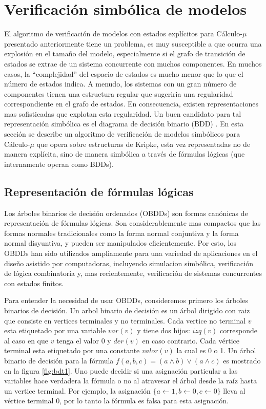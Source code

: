 \chapter{Verificación simbólica de modelos}

El algoritmo de verificación de modelos con estados explícitos para Cálculo-$\mu$ presentado anteriormente tiene un problema, es muy susceptible a que ocurra una explosión en el tamaño del modelo, especialmente si el grafo de transición de estados se extrae de un sistema concurrente con muchos componentes. En muchos casos, la “complejidad” del espacio de estados es mucho menor que lo que el número de estados indica. A menudo, los sistemas con un gran número de componentes tienen una estructura regular que sugeriria una regularidad correspondiente en el grafo de estados. En consecuencia, existen representaciones mas sofisticadas que explotan esta regularidad. Un buen candidato para tal representación simbólica es el diagrama de decisión binario (BDD) \cite{Burch:4}. En esta sección se describe un algoritmo de verificación de modelos simbólicos para Cálculo-$\mu$ que opera sobre estructuras de Kripke, esta vez representadas no de manera explícita, sino de manera simbólica a través de fórmulas lógicas (que internamente operan como BDDs).

\section{Representación de fórmulas lógicas}

Los árboles binarios de decisión ordenados (OBDDs) son formas canónicas de representación de fórmulas lógicas. Son considerablemente mas compactos que las formas normales tradicionales como la forma normal conjuntiva y la forma normal disyuntiva, y pueden ser manipulados eficientemente. Por esto, los OBDDs han sido utilizados ampliamente para una variedad de aplicaciones en el diseño asistido por computadoras, incluyendo simulacion simbólica, verificación de lógica combinatoria y, mas recientemente, verificación de sistemas concurrentes con estados finitos.

Para entender la necesidad de usar OBDDs, consideremos primero los árboles binarios de decisión. Un arbol binario de decisión es un árbol dirigido con raiz que consiste en vertices terminales y no terminales. Cada vertice no terminal $v$ esta etiquetado por una variable $var(v)$ y tiene dos hijos: $izq(v)$ corresponde al caso en que $v$ tenga el valor 0 y $der(v)$ en caso contrario. Cada vértice terminal esta etiquetado por una constante $valor(v)$ la cual es 0 o 1. Un árbol binario de decisión para la fórmula $f(a,b,c) = (a \land b) \lor (a \land c)$ es mostrado en la figura \ref{fig:bdt1}. Uno puede decidir si una asignación particular a las variables hace verdadera la fórmula o no al atravesar el árbol desde la raíz hasta un vertice terminal. Por ejemplo, la asignación $\{ a \gets 1, b \gets 0, c \gets 0\}$ lleva al vértice terminal 0, por lo tanto la fórmula es falsa para esta asignación.

